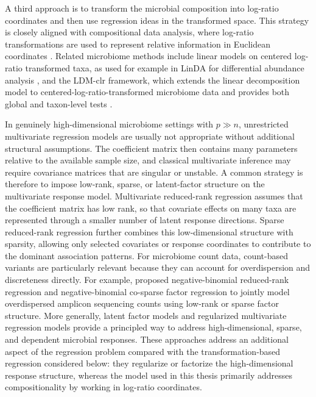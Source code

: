 A third approach is to transform the microbial composition into log-ratio coordinates and then use regression ideas in the transformed space. This strategy is closely aligned with compositional data analysis, where log-ratio transformations are used to represent relative information in Euclidean coordinates \citep{aitchison1986statistical,gloor2017microbiome,quinn2019field}. Related microbiome methods include linear models on centered log-ratio transformed taxa, as used for example in LinDA for differential abundance analysis \citep{zhou2022linda}, and the LDM-clr framework, which extends the linear decomposition model \citep{hu2020testing} to centered-log-ratio-transformed microbiome data and provides both global and taxon-level tests \citep{hu2023compositional}.

In genuinely high-dimensional microbiome settings with $p\gg n$, unrestricted multivariate regression models are usually not appropriate without additional structural assumptions. The coefficient matrix then contains many parameters relative to the available sample size, and classical multivariate inference may require covariance matrices that are singular or unstable. A common strategy is therefore to impose low-rank, sparse, or latent-factor structure on the multivariate response model. Multivariate reduced-rank regression \citep{reinsel2022multivariate} assumes that the coefficient matrix has low rank, so that covariate effects on many taxa are represented through a smaller number of latent response directions. Sparse reduced-rank regression further combines this low-dimensional structure with sparsity, allowing only selected covariates or response coordinates to contribute to the dominant association patterns. For microbiome count data, count-based variants are particularly relevant because they can account for overdispersion and discreteness directly. For example, \citet{mishra2022negative} proposed negative-binomial reduced-rank regression and negative-binomial co-sparse factor regression to jointly model overdispersed amplicon sequencing counts using low-rank or sparse factor structure. More generally, latent factor models and regularized multivariate regression models provide a principled way to address high-dimensional, sparse, and dependent microbial responses. These approaches address an additional aspect of the regression problem compared with the transformation-based regression considered below: they regularize or factorize the high-dimensional response structure, whereas the model used in this thesis primarily addresses compositionality by working in log-ratio coordinates.

